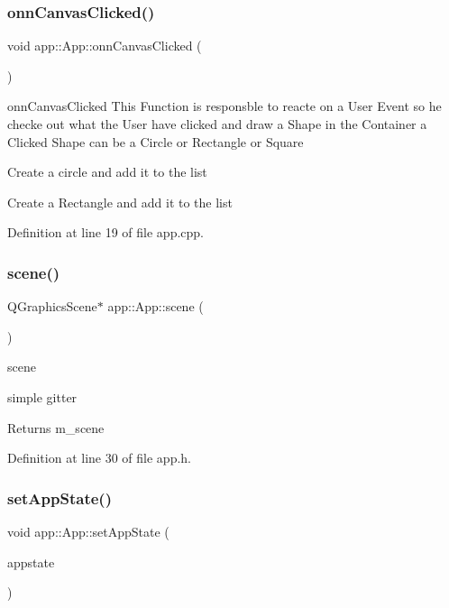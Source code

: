 \subsubsection{\texorpdfstring{onn\+Canvas\+Clicked()}{onnCanvasClicked()}}
{\footnotesize\ttfamily void app\+::\+App\+::onn\+Canvas\+Clicked (\begin{DoxyParamCaption}{ }\end{DoxyParamCaption})}



onn\+Canvas\+Clicked This Function is responsble to reacte on a User Event so he checke out what the User have clicked and draw a Shape in the Container a Clicked Shape can be a Circle or Rectangle or Square 

Create a circle and add it to the list

Create a Rectangle and add it to the list

Definition at line 19 of file app.\+cpp.

\mbox{\label{classapp_1_1_app_ad1cdc5d0a6c5017548fcdc7f86a2f496}} 
\subsubsection{\texorpdfstring{scene()}{scene()}}
{\footnotesize\ttfamily Q\+Graphics\+Scene$\ast$ app\+::\+App\+::scene (\begin{DoxyParamCaption}{ }\end{DoxyParamCaption})\hspace{0.3cm}{\ttfamily [inline]}}



scene 

simple gitter \begin{DoxyReturn}{Returns}
m\+\_\+scene 
\end{DoxyReturn}


Definition at line 30 of file app.\+h.

\mbox{\label{classapp_1_1_app_afd4230600c1a17e7b02764acd132de5b}} 
\subsubsection{\texorpdfstring{set\+App\+State()}{setAppState()}}
{\footnotesize\ttfamily void app\+::\+App\+::set\+App\+State (\begin{DoxyParamCaption}\item[{\mbox{\hyperlink{classapp_1_1_app_state}{App\+State}} $\ast$}]{appstate }\end{DoxyParamCaption})\hspace{0.3cm}{\ttfamily [inline]}}



